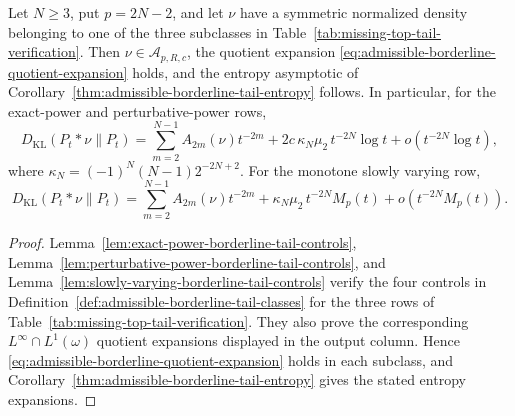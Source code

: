 \begin{proposition}%
\label{prop:log-tail-counterexample-top-moment}
\label{lem:pointwise-perturbative-power-tail-sufficient-condition}
\label{lem:borderline-exact-power-tail-quotient-expansion}
\label{thm:exact-perturbative-power-tail-log-replacement}
\label{cor:perturbative-power-tail-log-replacement}
\label{lem:perturbative-power-tail-quotient-expansion}
\label{lem:slowly-varying-quotient-controls}
\label{cor:conditional-slowly-varying-borderline-tail}
Let \(N\ge3\), put \(p=2N-2\), and let \(\nu\) have a symmetric normalized
density belonging to one of the three subclasses in
Table~\ref{tab:missing-top-tail-verification}.  Then
\(\nu\in\mathcal A_{p,R,c}\), the quotient expansion
\eqref{eq:admissible-borderline-quotient-expansion} holds, and the entropy
asymptotic of
Corollary~\ref{thm:admissible-borderline-tail-entropy} follows.  In
particular, for the exact-power and perturbative-power rows,
\[
D_{\mathrm{KL}}(P_t*\nu\|P_t)
=\sum_{m=2}^{N-1}A_{2m}(\nu)t^{-2m}
+2c\,\kappa_N\mu_2\,t^{-2N}\log t
+o(t^{-2N}\log t),
\]
where \(\kappa_N=(-1)^N(N-1)2^{-2N+2}\).  For the monotone slowly varying
row,
\begin{equation}\label{eq:slowly-varying-entropy-expansion}
D_{\mathrm{KL}}(P_t*\nu\|P_t)
=\sum_{m=2}^{N-1}A_{2m}(\nu)t^{-2m}
+\kappa_N\mu_2\,t^{-2N}M_p(t)
+o(t^{-2N}M_p(t)).
\end{equation}
\end{proposition}

\begin{proof}
Lemma~\ref{lem:exact-power-borderline-tail-controls},
Lemma~\ref{lem:perturbative-power-borderline-tail-controls}, and
Lemma~\ref{lem:slowly-varying-borderline-tail-controls} verify the four
controls in Definition~\ref{def:admissible-borderline-tail-classes} for the
three rows of Table~\ref{tab:missing-top-tail-verification}.  They also prove
the corresponding \(L^\infty\cap L^1(\omega)\) quotient expansions displayed
in the output column.  Hence
\eqref{eq:admissible-borderline-quotient-expansion} holds in each subclass,
and Corollary~\ref{thm:admissible-borderline-tail-entropy} gives the stated
entropy expansions.
\end{proof}
